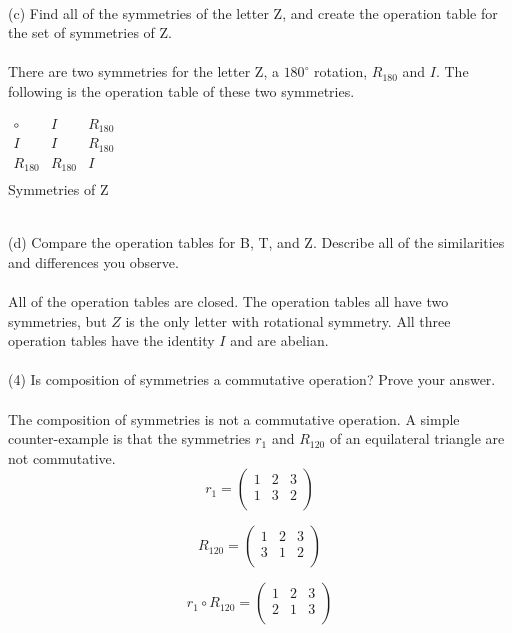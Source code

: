 \documentclass[11pt,a4paper]{article}
\begin{document}
~\\
(c) Find all of the symmetries of the letter Z, and create the operation table
for the set of symmetries of Z.\\
~\\
There are two symmetries for the letter Z, a $180^\circ$ rotation, $R_{180}$ and $I$. The following is the operation table of these two symmetries.\\
\begin{center}
$
\begin{array}{c|c|c}
\circ & I & R_{180} \\\hline
I & I & R_{180} \\\hline
R_{180} & R_{180} & I \\
\end{array}
$\\
Symmetries of Z
\end{center}
~\\
(d) Compare the operation tables for B, T, and Z. Describe all of the similarities and differences you observe.\\
~\\
All of the operation tables are closed. The operation tables all have two symmetries, but $Z$ is the only letter with rotational symmetry. All three operation tables have the identity $I$ and are abelian.\\
~\\
(4) Is composition of symmetries a commutative operation? Prove your answer.\\
~\\
The composition of symmetries is not a commutative operation. A simple counter-example is that the symmetries $r_1$ and $R_{120}$ of an equilateral triangle are not commutative.\\

\[
r_1 = \left(\begin{array}{ccc}
1&2&3\\
1&3&2\\
\end{array}\right)
\]

\[
R_{120} = \left(\begin{array}{ccc}
1&2&3\\
3&1&2\\
\end{array}\right)
\]

\[
r_1\circ R_{120} = \left(\begin{array}{ccc}
1&2&3\\
2&1&3\\
\end{array}\right)
\]
\end{document}
